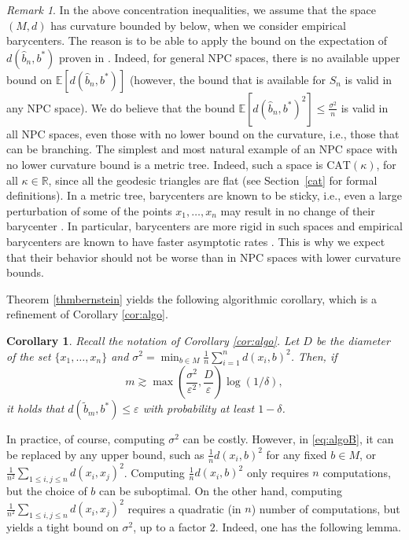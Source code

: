 \documentclass[10pt,a4paper]{article}
\theoremstyle{plain}
\newtheorem{corollary}[theorem]{Corollary}
\theoremstyle{definition}
\theoremstyle{remark}
\newtheorem{remark}[theorem]{Remark}
\newcommand{\R}{\mathbb{R}}
\newcommand{\E}{\mathbb{E}}
\newcommand{\CAT}{\textrm{CAT}}
\begin{document}
\begin{remark}
    In the above concentration inequalities, we assume that the space $(M,d)$ has curvature bounded by below, when we consider empirical barycenters. The reason is to be able to apply the bound on the expectation of $d(\hat b_n,b^*)$ proven in \cite[Corollary 11]{fastconv}. Indeed, for general NPC spaces, there is no available upper bound on $\E[d(\hat b_n,b^*)]$ (however, the bound that is available for $S_n$ \cite[Theorem 4.7]{sturm03} is valid in any NPC space). We do believe that the bound $\E[d(\hat b_n,b^*)^2]\leq \frac{\sigma^2}{n}$ is valid in all NPC spaces, even those with no lower bound on the curvature, i.e., those that can be branching. The simplest and most natural example of an NPC space with no lower curvature bound is a metric tree. Indeed, such a space is $\CAT(\kappa)$, for all $\kappa\in\R$, since all the geodesic triangles are flat (see Section~\ref{cat} for formal definitions). In a metric tree, barycenters are known to be sticky, i.e., even a large perturbation of some of the points $x_1,\ldots,x_n$ may result in no change of their barycenter \cite[Proposition 5.7]{sturm03}. In particular, barycenters are more rigid in such spaces and empirical barycenters are known to have faster asymptotic rates \cite{hotz2013sticky}. This is why we expect that their behavior should not be worse than in NPC spaces with lower curvature bounds. 

\end{remark}


Theorem \ref{thmbernstein} yields the following algorithmic corollary, which is a refinement of Corollary \ref{cor:algo}.

\begin{corollary} \label{cor:algo2}
    Recall the notation of Corollary \ref{cor:algo}. Let $D$ be the diameter of the set $\{x_1,\ldots,x_n\}$ and $\sigma^2=\min_{b\in M} \frac{1}{n}\sum_{i=1}^n d(x_i,b)^2$. Then, if 
\begin{equation} \label{eq:algoB}
    m\gtrsim \max\left(\frac{\sigma^2}{\varepsilon^2},\frac{D}{\varepsilon}\right)\log(1/\delta),
\end{equation}
it holds that $d(\tilde b_m,b^*)\leq \varepsilon$ with probability at least $1-\delta$.
\end{corollary}

In practice, of course, computing $\sigma^2$ can be costly. However, in \eqref{eq:algoB}, it can be replaced by any upper bound, such as $\frac{1}{n}d(x_i,b)^2$ for any fixed $b\in M$, or $\frac{1}{n^2}\sum_{1\leq i,j\leq n} d(x_i,x_j)^2$. Computing $\frac{1}{n}d(x_i,b)^2$ only requires $n$ computations, but the choice of $b$ can be suboptimal. On the other hand, computing $\frac{1}{n^2}\sum_{1\leq i,j\leq n} d(x_i,x_j)^2$ requires a quadratic (in $n$) number of computations, but yields a tight bound on $\sigma^2$, up to a factor $2$. Indeed, one has the following lemma.
\end{document}
